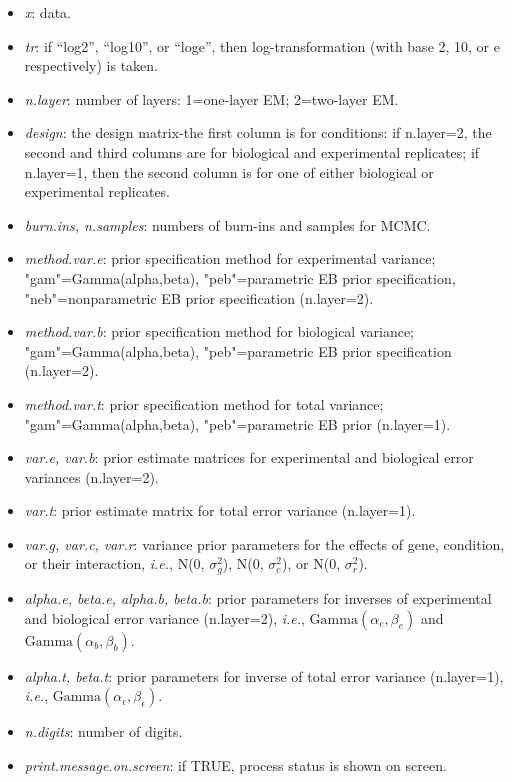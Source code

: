 \documentclass[12pt]{article}
\newcommand{\Rfunarg}[1]{{\textit{#1}}}
\begin{document}
\begin{itemize}
\item{\Rfunarg{x}}: data.
\item{\Rfunarg{tr}}: if ``log2'', ``log10'', or ``loge'', then log-transformation (with base 2, 10, or e respectively) is taken.
\item{\Rfunarg{n.layer}}: number of layers: 1=one-layer EM; 2=two-layer EM.
\item{\Rfunarg{design}}: the design matrix-the first column is for conditions: 
if n.layer=2, the second and third columns are for biological and experimental replicates;
if n.layer=1, then the second column is for one of either biological or experimental replicates.
\item{\Rfunarg{burn.ins, n.samples}}: numbers of burn-ins and samples for MCMC. 
\item{\Rfunarg{method.var.e}}: prior specification method for experimental variance;
          "gam"=Gamma(alpha,beta),  "peb"=parametric EB prior
          specification,  "neb"=nonparametric EB prior specification  (n.layer=2).
\item{\Rfunarg{method.var.b}}: prior specification method for biological variance;
          "gam"=Gamma(alpha,beta),  "peb"=parametric EB prior
          specification (n.layer=2).
\item{\Rfunarg{ method.var.t}}: prior specification method for total variance;
          "gam"=Gamma(alpha,beta),  "peb"=parametric EB prior (n.layer=1).       
\item{\Rfunarg{var.e, var.b}}: prior estimate matrices for experimental and biological error variances (n.layer=2). 
\item{\Rfunarg{var.t}}: prior estimate matrix for total error variance (n.layer=1).
\item{\Rfunarg{var.g, var.c, var.r}}: variance prior parameters for the effects of gene, condition, or their interaction, 
{\it i.e.}, N(0, $\sigma^2_g$), N(0, $\sigma^2_c$), or N(0, $\sigma^2_r$). 
\item{\Rfunarg{alpha.e, beta.e, alpha.b, beta.b}}: 
prior parameters for inverses of experimental and biological error variance (n.layer=2), 
{\it i.e.}, $\mbox{Gamma}(\alpha_e,\beta_e)$ and $\mbox{Gamma}(\alpha_b,\beta_b)$. 
\item{\Rfunarg{alpha.t, beta.t}}: 
prior parameters for inverse of total error variance (n.layer=1), 
{\it i.e.}, $\mbox{Gamma}(\alpha_\epsilon,\beta_\epsilon)$. 
\item{\Rfunarg{n.digits}}: number of digits.
\item{\Rfunarg{print.message.on.screen}}: if TRUE, process status is shown on screen.
\end{itemize}
\end{document}
